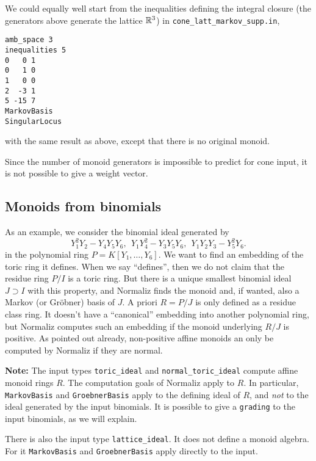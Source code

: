 We could equally well start from the inequalities defining the integral closure (the generators above generate the lattice ${\mathbb R}^3$) in \verb|cone_latt_markov_supp.in|,
\begin{Verbatim}
amb_space 3
inequalities 5
0   0 1
0   1 0
1   0 0
2  -3 1
5 -15 7
MarkovBasis
SingularLocus
\end{Verbatim}
with the same result as above, except that there is no original monoid.

Since the number of monoid generators is impossible to predict for cone input, it is not possible to give a weight vector.

\subsection{Monoids from binomials}\label{binom_ex}

As an example, we consider the binomial ideal generated by
$$
Y_1^2Y_2-Y_4Y_5Y_6,\ \ Y_1Y_4^2-Y_3Y_5Y_6,\ \ Y_1Y_2Y_3-Y_5^2Y_6.
$$
in the polynomial ring $P=K[Y_1,\dots, Y_6]$. We want to find an embedding of the toric ring it defines. When we say ``defines'', then we do not claim that the residue ring  $P/I$ is a toric ring. But there is a unique smallest binomial ideal $J\supset I$ with this property, and Normaliz finds the monoid and, if wanted, also a Markov (or Gröbner) basis of $J$. A priori $R=P/J$ is only defined as a residue class ring. It doesn't have a ``canonical'' embedding into another polynomial ring, but Normaliz computes such an embedding if the monoid underlying $R/J$ is positive. As pointed out already, non-positive affine monoids an only be computed by Normaliz if they are normal.

\textbf{Note:} \enspace The input types \verb*|toric_ideal| and \verb*|normal_toric_ideal| compute affine monoid rings $R$. The computation goals of Normaliz apply to $R$. In particular, \verb*|MarkovBasis| and \verb*|GroebnerBasis| apply to the defining ideal of $R$, and \emph{not} to the ideal generated by the input binomials. It is possible to give a \verb*|grading| to the input binomials, as we will explain. 

There is also the input type \verb*|lattice_ideal|. It does not define a monoid algebra. For it \verb*|MarkovBasis| and \verb*|GroebnerBasis| apply directly to the input.

